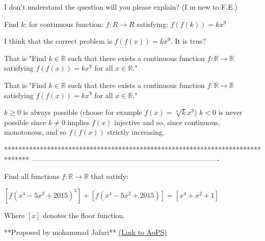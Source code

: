 \begin{solution}
	I don't understand the question will you please explain? (I m new to F.E.)
\end{solution}



\begin{solution}
	\begin{tcolorbox}Find $ k$: for continuous function: $ f: R\rightarrow  R$ satisfying:
$ f\left ( f\left ( k \right ) \right )= kx^{9}$\end{tcolorbox}

I think that the correct problem is $ f\left ( f\left ( x \right ) \right )= kx^{9}$. It is true?


\end{solution}



\begin{solution}
	That is "Find $k\in\mathbb{R}$ such that there exists a continuous function $f:\mathbb{R} \rightarrow\mathbb{R}$ satisfying $f(f(x))=kx^9$ for all $x\in\mathbb{R}$."
\end{solution}



\begin{solution}
	\begin{tcolorbox}That is "Find $k\in\mathbb{R}$ such that there exists a continuous function $f:\mathbb{R} \rightarrow\mathbb{R}$ satisfying $f(f(x))=kx^9$ for all $x\in\mathbb{R}$."\end{tcolorbox}
$k\ge 0$ is always possible (choose for example $f(x)=\sqrt[4]kx^3$)
$k<0$ is never possible since $k\ne 0$ implies $f(x)$ injective and so, since continuous, monotonous, and so $f(f(x))$ strictly increasing.
\end{solution}
*******************************************************************************
-------------------------------------------------------------------------------

\begin{problem}
	Find all functions $f:\mathbb{R} \to \mathbb{R}$ that satisfy:

$[f(x^4-5x^2+2015)^3]+[f(x^4-5x^2+2015)]=[x^4+x^2+1]$

Where $[x]$ denotes the floor function.

**Proposed by mohammad Jafari**
	\flushright \href{https://artofproblemsolving.com/community/c6h1574656}{(Link to AoPS)}
\end{problem}



